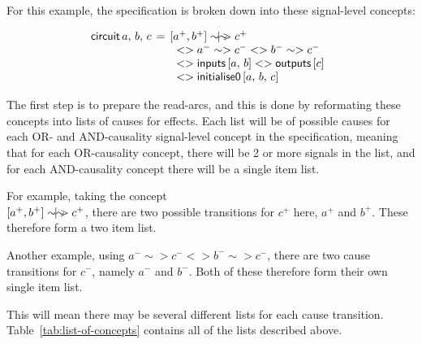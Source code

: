 \documentclass[british,conference,compsoc]{IEEEtran}
\begin{document}
For this example, the specification is broken down into these signal-level 
concepts:

\vspace{-4mm}
\[
\begin{array}{lcl}
\hspace{-2mm}\mathsf{circuit}\,a,\,b,\,c&\hspace{-2mm}=
	&\hspace{-2mm}[a^{+}, b^{+}]
	\sim\hspace{-1.5mm}|\hspace{-1.5mm}\sim\hspace{-1.5mm}>c^{+}\\
~&\hspace{-2mm}&<>a^{-}\sim> c^{-} <> b^{-}\sim> c^{-}\\
~&\hspace{-2mm}&<> \mathsf{inputs} \, [a,\,b] <>\mathsf{outputs}\,[c] \\
~&\hspace{-2mm}&<>\mathsf{initialise0}\,[a,\,b,\,c]
\end{array}
\]

\vspace{-1mm}

\noindent The first step is to prepare the read-arcs, and this is done by
reformating these concepts into lists of causes for effects.
Each list will be of possible causes for each OR- and AND-causality signal-level
concept in the specification, meaning that for each OR-causality concept, 
there will be 2 or more signals in the list, and for each AND-causality 
concept there will be a single item list.

For example, taking the concept\\$[a^{+}, b^{+}]
\sim\hspace{-1.5mm}|\hspace{-1.5mm}\sim\hspace{-1.5mm}>c^{+}$, there are
two possible transitions for $c^{+}$ here, $a^{+}$ and $b^{+}$. These therefore 
form a two item list. 

Another example, using 
$a^{-}\sim> c^{-} <> b^{-}\sim> c^{-}$, there are two
cause transitions for $c^{-}$, namely $a^{-}$ and $b^{-}$. Both of these 
therefore form their own single item list. 

This will mean there may be several different lists for each cause transition. 
Table~\ref{tab:list-of-concepts} contains all of the lists described above.

\vspace{-1mm}
\end{document}
